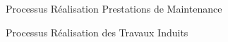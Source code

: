 \begin{figure}[H]
    \label{fig-realisation-prest}
    \noindent{}
    \caption{Processus Réalisation Prestations de Maintenance}
\end{figure}

\begin{figure}[H]
    \label{fig-travaux-induits}
    \noindent{}
    \caption{Processus Réalisation des Travaux Induits}
\end{figure}


